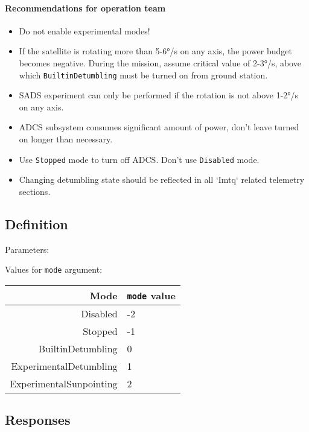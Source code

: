 \paragraph{Recommendations for operation team}
\begin{itemize}
    \item Do not enable experimental modes!
    \item If the satellite is rotating more than 5-6°/s on any axis, the power budget becomes negative. During the mission, assume critical value of 2-3°/s, above which \texttt{BuiltinDetumbling} must be turned on from ground station.
    \item SADS experiment can only be performed if the rotation is not above 1-2°/s on any axis.    
    \item ADCS subsystem consumes significant amount of power, don't leave turned on longer than necessary.
    \item Use \texttt{Stopped} mode to turn off ADCS. Don't use \texttt{Disabled} mode.
    \item Changing detumbling state should be reflected in all `Imtq` related telemetry sections.
\end{itemize}

\subsection{Definition}

Parameters: 

\begin{tcarglist}	
\end{tcarglist}

Values for \texttt{mode} argument:

\begin{tabular}{r | l}
    Mode & \texttt{mode} value \\
    \hline
    Disabled & -2 \\
    Stopped & -1 \\
    BuiltinDetumbling & 0 \\
    ExperimentalDetumbling & 1 \\
    ExperimentalSunpointing & 2 \\
\end{tabular}


\subsection{Responses}

